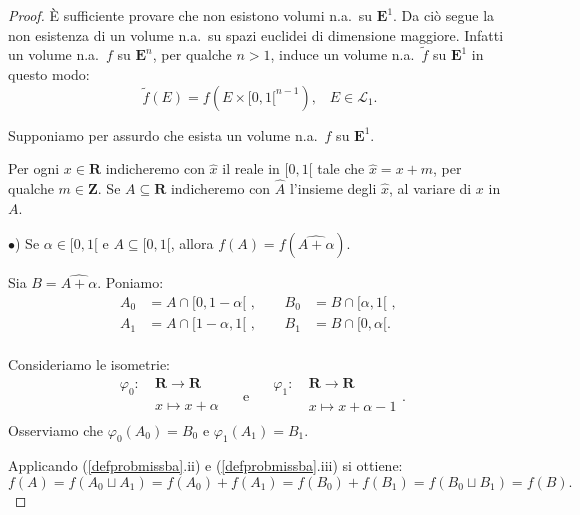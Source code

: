 \documentclass[a4paper,oneside,11pt]{book}
\theoremstyle{definition} \newtheorem{Def}{Definizione}
\theoremstyle{plain} \newtheorem{teo}{Teorema}
\theoremstyle{plain} \newtheorem{cor}[teo]{Corollario}
\theoremstyle{definition} \newtheorem{lem}[teo]{Lemma}
\theoremstyle{plain} \newtheorem{pro}[teo]{Proposizione}
\begin{document}
	\begin{proof}
		È sufficiente provare che non esistono volumi n.a.\ su $\mathbf{E}^1$. Da ciò segue la non esistenza di un volume n.a.\ su spazi euclidei di dimensione maggiore. Infatti un volume n.a.\ $f$ su $\mathbf{E}^n$, per qualche $n >1$, induce un volume n.a.\ $\tilde{f}$ su $\mathbf{E}^1$ in questo modo:
		\begin{equation*}
			\tilde{f}(E) = f(E \times [0,1[^{n-1})\text{,}\quad E \in \mathcal{L}_1 \text{.} %
		\end{equation*}
		
		Supponiamo per assurdo che esista un volume n.a.\ $f$ su $\mathbf{E}^1$.
		
		Per ogni $x \in \mathbf{R}$ indicheremo con $\hat{x}$ il reale in $[0,1[$ tale che $\hat{x} = x + m$, per qualche $m \in \mathbf{Z}$. Se $A \subseteq \mathbf{R}$ indicheremo con $\hat{A}$ l'insieme degli $\hat{x}$, al variare di $x$ in $A$. %
		
		$\bullet$) Se $\alpha \in [0,1[$ e $A \subseteq [0,1[$, allora $f(A) = f(\widehat{A + \alpha})$.%
		
		Sia $B = \widehat{A + \alpha}$. Poniamo:
		\begin{equation*}
			\begin{aligned}
				A_0 &= A \cap [0, 1-\alpha[ \text{ , }&\quad B_0 &= B \cap [\alpha, 1[ \text{ , }\\
				A_1 &= A \cap [1-\alpha, 1[ \text{ , }&\quad B_1 &= B \cap [0, \alpha[ \text{.}\\%
			\end{aligned}
		\end{equation*}
				
		Consideriamo le isometrie:
		\begin{equation*}
			\begin{aligned}
				\varphi_0:\ & \mathbf{R} \to \mathbf{R} \\
				&x \mapsto x + \alpha \\
			\end{aligned} \quad \text{ e } \quad \begin{aligned}
				\varphi_1:\ & \mathbf{R} \to \mathbf{R} \\
				&x \mapsto x + \alpha - 1 \\
			\end{aligned} \text{.}
		\end{equation*}
		Osserviamo che $\varphi_0(A_0) = B_0$ e $\varphi_1(A_1) = B_1$.	
		 
		Applicando (\ref{defprobmissba}.ii) e (\ref{defprobmissba}.iii) si ottiene:
		\begin{equation*}
			f(A) = f(A_0 \sqcup A_1) = f(A_0) + f(A_1) = f(B_0) + f(B_1) = f(B_0 \sqcup B_1) = f(B) \text{.}
		\end{equation*}
		

\end{proof}
\end{document}
